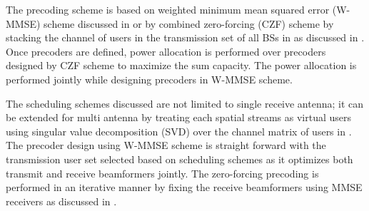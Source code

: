 The precoding scheme is based on weighted minimum mean squared error (W-MMSE) scheme discussed in \cite{wmmse_shi} or by combined zero-forcing (CZF) scheme by stacking the channel of users in the transmission set of all BSs in  as discussed in \cite{spencer2004zero}. Once precoders are defined, power allocation is performed over precoders designed by CZF scheme to maximize the sum capacity. The power allocation is performed jointly while designing precoders in W-MMSE scheme.

The scheduling schemes discussed are not limited to single receive antenna; it can be extended for multi antenna by treating each spatial streams as virtual users using singular value decomposition (SVD) over the channel matrix of users in . The precoder design using W-MMSE scheme is straight forward with the transmission user set selected based on scheduling schemes as it optimizes both transmit and receive beamformers jointly. The zero-forcing precoding is performed in an iterative manner by fixing the receive beamformers using MMSE receivers as discussed in \cite{antti_user_selection}. 